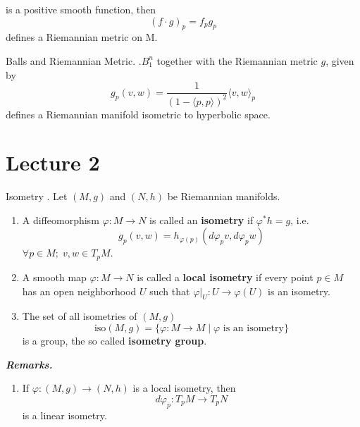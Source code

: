 \documentclass{article}
\begin{document}
is a positive smooth function, then
\begin{equation}
  (f \cdot g)_p = f_p g_p
\end{equation}
defines a Riemannian metric on M.

\begin{Example}[]{Balls and Riemannian Metric.}
.$B_1^n$ together with the Riemannian metric $g$, given by
\begin{equation}
  g_p(v, w) = \frac{1}{(1-\langle p, p \rangle)^2}\langle v, w \rangle_{p}
\end{equation}
defines a Riemannian manifold isometric to hyperbolic space. 
\end{Example}

\section{Lecture 2}

\begin{Definition}{Isometry}
.  Let $(M, g)$ and $(N, h)$ be Riemannian manifolds.
\begin{enumerate}
\item A diffeomorphism $\varphi : M \rightarrow N$ is called an \textbf{isometry} if $\varphi^{*}h = g$, i.e.
  \begin{equation}
    g_p(v, w) = h_{\varphi(p)} (d\varphi_pv, d\varphi_pw)
  \end{equation}
  $\forall p \in M; \; v, w \in T_pM$.
\item A smooth map $\varphi: M \rightarrow N$ is called a \textbf{local isometry} if every point $p \in M$ has an open neighborhood $U$ such that $\varphi|_U : U \rightarrow \varphi(U)$ is an isometry.
\item The set of all isometries of $(M, g)$
  \begin{equation}
    \text{iso} (M, g) = \{ \varphi : M \rightarrow M \; | \; \varphi \text{ is an isometry} \}
  \end{equation}
  is a group, the so called \textbf{isometry group}.
\end{enumerate}
\end{Definition}

\textbf{\textit{Remarks.}}

\begin{enumerate}
\item If $\varphi : (M, g) \rightarrow (N, h)$ is a local isometry, then
  \begin{equation}
    d \varphi_p : T_p M \rightarrow T_p N
  \end{equation}
  is a linear isometry.
\end{enumerate}
\end{document}
